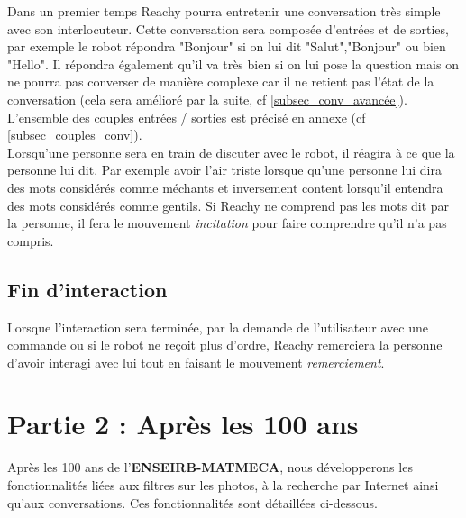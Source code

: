 Dans un premier temps Reachy pourra entretenir une conversation très simple avec son interlocuteur. Cette conversation sera composée d'entrées et de sorties, par exemple le robot répondra "Bonjour" si on lui dit "Salut","Bonjour" ou bien "Hello". Il répondra également qu'il va très bien si on lui pose la question mais on ne pourra pas converser de manière complexe car il ne retient pas l'état de la conversation (cela sera amélioré par la suite, cf \ref{subsec_conv_avancée}). L'ensemble des couples entrées / sorties est précisé en annexe (cf \ref{subsec_couples_conv}). \\

Lorsqu'une personne sera en train de discuter avec le robot, il réagira à ce que la personne lui dit. Par exemple avoir l'air triste lorsque qu'une personne lui dira des mots considérés comme méchants et inversement content lorsqu'il entendra des mots considérés comme gentils. Si Reachy ne comprend pas les mots dit par la personne, il fera le mouvement \textit{incitation} pour faire comprendre qu'il n'a pas compris.

\subsection{Fin d'interaction}
Lorsque l'interaction sera terminée, par la demande de l'utilisateur avec une commande ou si le robot ne reçoit plus d'ordre, Reachy remerciera la personne d'avoir interagi avec lui tout en faisant le mouvement \textit{remerciement}.

\newpage

\section{Partie 2 : Après les 100 ans}
Après les 100 ans de l'\textbf{ENSEIRB-MATMECA}, nous développerons les fonctionnalités liées aux filtres sur les photos, à la recherche par Internet ainsi qu'aux conversations. Ces fonctionnalités sont détaillées ci-dessous.\\

